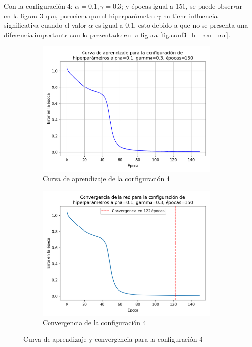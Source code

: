 \documentclass{article}
\begin{document}
Con la configuración 4: $\alpha=0.1, \gamma=0.3$; y épocas igual a 150, se puede observar en la figura \ref{fig:conf4_lr_con_xor} que, pareciera que el hiperparámetro $\gamma$ no tiene influencia significativa cuando el valor $\alpha$ es igual a $0.1$, esto debido a que no se presenta una diferencia importante con lo presentado en la figura \ref{fig:conf3_lr_con_xor}.

\begin{figure}[h!]
    \centering
    \begin{subfigure}{0.49\textwidth}
        \includegraphics[width=\textwidth]{imgs/XOR/configs/curva_aprendizaje_alpha_0.1_gamma_0.3_epochs_150.png}
        \caption{Curva de aprendizaje de la configuración 4}
        \label{fig:conf_4_xor_lr}
    \end{subfigure}
    \hfill
    \begin{subfigure}{0.49\textwidth}
        \includegraphics[width=\textwidth]{imgs/XOR/configs/convergencia_alpha_0.1_gamma_0.3_epochs_150.png}
        \caption{Convergencia de la configuración 4}
        \label{fig:conf4_xor_con}
    \end{subfigure}
    \caption{Curva de aprendizaje y convergencia para la configuración 4}
    \label{fig:conf4_lr_con_xor}
\end{figure}
\newpage
\end{document}

